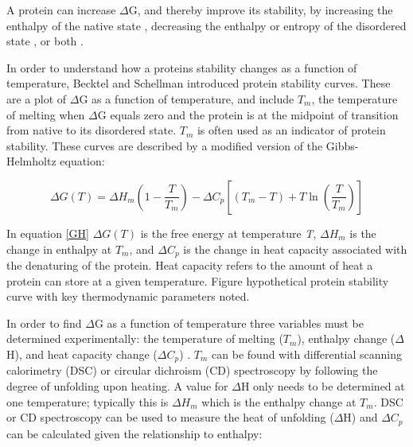 
A protein can increase $\Delta$G, and thereby improve its stability, by 
increasing the enthalpy of the native state \cite{119}, decreasing the enthalpy or
entropy of the disordered state \cite{120,121}, or both \cite{122,123}. 

In order to understand how a proteins stability changes as a function of
temperature, Becktel and Schellman \cite{becktel1987psc} introduced protein
stability curves.  These are a plot of $\Delta$G as a function of temperature,
and include ${T}_{m}$, the temperature of melting when $\Delta$G equals zero
and the protein is at the midpoint of transition from native to its disordered
state. ${T}_{m}$ is often used as an indicator of protein stability.  These
curves are described by a modified version of the Gibbs-Helmholtz equation:

\begin{equation}\label{GH}
 \Delta G \left (  T \right )  =  \Delta  {H }_{m }  \left (  1 -  \frac{ T }{  {T }_{m } }  \right ) -  \Delta  {C }_{p } \left[   \left (  {T }_{m }  - T \right ) + T \ln  \left (   \frac{ T}{ { T}_{ m}  }  \right )  \right ] 
\end{equation}

In equation \eqref{GH} $\Delta G \left (  T \right )$ is the free energy at
temperature \emph{T}, $\Delta  {H }_{m }$ is the change in enthalpy at ${T }_{m
}$, and $\Delta  {C }_{p }$ is the change in heat capacity associated with the
denaturing of the protein. Heat capacity refers to the amount of heat a protein
can store at a given temperature.  Figure %
hypothetical protein stability curve with key thermodynamic parameters noted.

In order to find $\Delta$G as a function of temperature three variables must be
determined experimentally: the temperature of melting (${T }_{m}$), enthalpy
change ($\Delta$H), and heat capacity change ($\Delta{C}_{p}$)
\cite{pace1997mcs}. ${T}_{m}$ can be found with differential scanning
calorimetry (DSC) or circular dichroism (CD) spectroscopy by following the
degree of unfolding upon heating. A value for $\Delta$H only needs to be
determined at one temperature; typically this is $\Delta{H}_{m}$ which is the
enthalpy change at ${T}_{m}$. DSC or CD spectroscopy can be used to measure
the heat of unfolding ($\Delta$H) and $\Delta{C}_{p}$ can be calculated given the
relationship to enthalpy:

